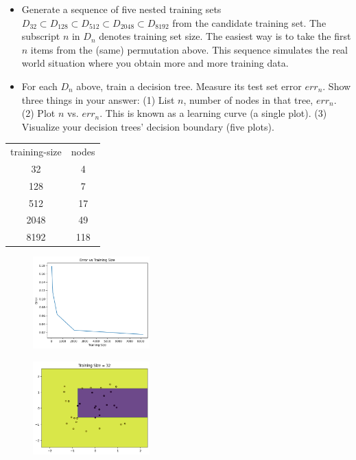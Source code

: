 \documentclass[a4paper]{article}
\theoremstyle{definition}
\begin{document}
\begin{enumerate}
\begin{itemize}
  \item Generate a sequence of five nested training sets $D_{32} \subset D_{128} \subset D_{512} \subset D_{2048} \subset D_{8192}$ from the candidate training set.  The subscript $n$ in $D_n$ denotes training set size.  The easiest way is to take the first $n$ items from the (same) permutation above.  This sequence simulates the real world situation where you obtain more and more training data.
  
  \item For each $D_n$ above, train a decision tree.  Measure its test set error $err_n$.  Show three things in your answer: (1) List $n$, number of nodes in that tree, $err_n$. (2) Plot $n$ vs. $err_n$.  This is known as a learning curve (a single plot). (3) Visualize your decision trees' decision boundary (five plots). \\
  \end{itemize}
  
  \begin{tabular}{ c c }
  	training-size &  nodes \\
  	32 &  4\\ 
  	128 & 7 \\
  	512 & 17 \\
  	2048 & 49  \\
  	8192 & 118
  \end{tabular}
  
  \begin{figure}[H]
  	\centering
  	\includegraphics[width=0.4\textwidth]{q71.png}  
  	\captionsetup{labelformat=empty}
  	\caption{}
  	\label{fig:my_label}
  \end{figure}
  
  \begin{figure}[H]
  	\centering
  	\includegraphics[width=0.4\textwidth]{q72.png}  
  	\captionsetup{labelformat=empty}
  	\caption{}
  	\label{fig:my_label}
  \end{figure}
  

\end{enumerate}
\end{document}
